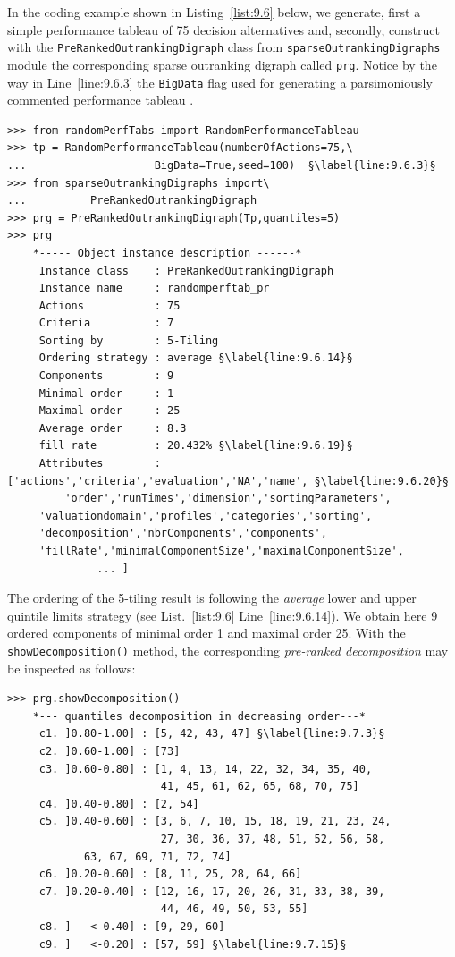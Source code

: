 In the coding example shown in Listing~\vref{list:9.6} below, we generate, first a simple performance tableau of 75 decision alternatives and, secondly, construct with the \texttt{PreRankedOutrankingDigraph} class from \texttt{sparseOut\-rankingDi\-graphs} module the corresponding sparse outranking digraph called \texttt{prg}. Notice by the way in Line~\ref{line:9.6.3} the \texttt{BigData} flag used for generating a parsimoniously commented performance tableau \citep{BIS-2021b}.
\begin{lstlisting}[caption={Computing a \emph{pre-ranked} sparse outranking digraph},label=list:9.6]
>>> from randomPerfTabs import RandomPerformanceTableau
>>> tp = RandomPerformanceTableau(numberOfActions=75,\
...                    BigData=True,seed=100)  §\label{line:9.6.3}§
>>> from sparseOutrankingDigraphs import\
...          PreRankedOutrankingDigraph
>>> prg = PreRankedOutrankingDigraph(Tp,quantiles=5)
>>> prg
    *----- Object instance description ------*
     Instance class    : PreRankedOutrankingDigraph
     Instance name     : randomperftab_pr
     Actions           : 75
     Criteria          : 7
     Sorting by        : 5-Tiling
     Ordering strategy : average §\label{line:9.6.14}§
     Components        : 9
     Minimal order     : 1
     Maximal order     : 25
     Average order     : 8.3
     fill rate         : 20.432% §\label{line:9.6.19}§
     Attributes        : ['actions','criteria','evaluation','NA','name', §\label{line:9.6.20}§
         'order','runTimes','dimension','sortingParameters',
	 'valuationdomain','profiles','categories','sorting',
	 'decomposition','nbrComponents','components',
	 'fillRate','minimalComponentSize','maximalComponentSize',
              ... ]
\end{lstlisting}

The ordering of the 5-tiling result is following the \emph{average} lower and upper quintile limits strategy (see List.~\vref{list:9.6} Line~\ref{line:9.6.14}). We obtain here 9 ordered components of minimal order 1 and maximal order 25. With the \texttt{showDecomposition()} method, the corresponding \emph{pre-ranked decomposition} may be inspected as follows:
\begin{lstlisting}[caption={The quantiles decomposition of a pre-ranked outranking digraph},label=list:9.7]
>>> prg.showDecomposition()
    *--- quantiles decomposition in decreasing order---*
     c1. ]0.80-1.00] : [5, 42, 43, 47] §\label{line:9.7.3}§
     c2. ]0.60-1.00] : [73]
     c3. ]0.60-0.80] : [1, 4, 13, 14, 22, 32, 34, 35, 40,
                        41, 45, 61, 62, 65, 68, 70, 75]
     c4. ]0.40-0.80] : [2, 54]
     c5. ]0.40-0.60] : [3, 6, 7, 10, 15, 18, 19, 21, 23, 24,
                        27, 30, 36, 37, 48, 51, 52, 56, 58,
			63, 67, 69, 71, 72, 74]
     c6. ]0.20-0.60] : [8, 11, 25, 28, 64, 66]
     c7. ]0.20-0.40] : [12, 16, 17, 20, 26, 31, 33, 38, 39,
                        44, 46, 49, 50, 53, 55]
     c8. ]   <-0.40] : [9, 29, 60]
     c9. ]   <-0.20] : [57, 59] §\label{line:9.7.15}§
\end{lstlisting}

